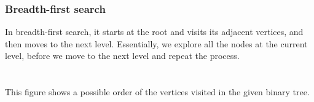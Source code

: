 \documentclass[a4paper]{article}
\begin{document}
\subsubsection{Breadth-first search}
In breadth-first search, it starts at the root and visits its adjacent vertices, and then moves to the next level. Essentially, we explore all the nodes at the current level, before we move to the next level and repeat the process.\\\\\\
This figure shows a possible order of the vertices visited in the given binary tree.
\begin{center}
\end{center}
\end{document}
